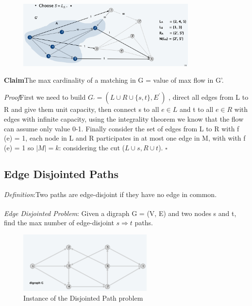 \documentclass[11pt]{article}
\newenvironment{claim}[1]{\par\textbf{Claim}\space#1}{}
\newenvironment{proof}[1]{\par\textit{Proof}\space#1}{\hfill\ensuremath{\square}}
\begin{document}
\begin{figure}[H]
		\centering
		\includegraphics[width=0.8\textwidth ]{hall}
		\caption{}
\end{figure}


\begin{claim}
The max cardinality of a matching in G = value of max flow in G'.
\end{claim}\\

\begin{proof}
First we need to build $G_{'} = (L \cup R \cup \{s, t\}, E^{'} )$ , direct all edges from L to R and give them unit capacity, then connect s to all $e \in L$ and t to all $e \in R$ with edges with infinite capacity, using the integrality theorem we know that the flow can assume only value 0-1. Finally consider the set of edges from L to R with f (e) = 1, each node in L and R participates in at most one edge in M, with with f (e) = 1 so $| M | = k$: considering the  cut ($L \cup s, R \cup t$).
\end{proof}

\subsection{Edge Disjointed Paths}
\emph{Definition}:Two paths are edge-disjoint if they have no edge in common.\\\\
\emph{Edge Disjointed Problem}: Given a digraph G = (V, E) and two nodes s and t, find the max number of edge-disjoint $s \Rightarrow t$ paths.


\begin{figure}[H]
		\centering
		\includegraphics[width=0.6\textwidth ]{disjointed}
		\caption{Instance of the Disjointed Path problem}
\end{figure}
\end{document}
